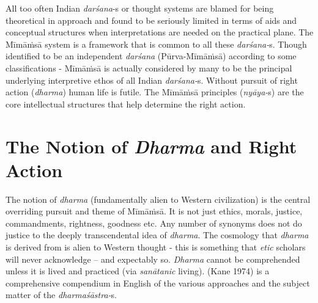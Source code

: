 All too often Indian \textit{darśana}-s or thought systems are blamed for being theoretical in approach and found to be seriously limited in terms of aids and conceptual structures when interpretations are needed on the practical plane. The Mīmāṁsā system is a framework that is common to all these \textit{darśana-}s. Though identified to be an independent \textit{darśana} (Pūrva-Mīmāṁsā) according to some classifications - Mīmāṁsā is actually considered by many to be the principal underlying interpretive ethos of all Indian \textit{darśana-}s. Without pursuit of right action (\textit{dharma}) human life is futile. The Mīmāṁsā principles (\textit{nyāya-}s) are the core intellectual structures that help determine the right action.


\section*{The Notion of \textit{Dharma} and Right Action}

\vspace{-.1cm}

The notion of \textit{dharma} (fundamentally alien to Western civilization) is the central overriding pursuit and theme of Mīmāṁsā. It is not just ethics, morals, justice, commandments, rightness, goodness etc. Any number of synonyms does not do justice to the deeply transcendental idea of \textit{dharma}. The cosmology that \textit{dharma} is derived from is alien to Western thought - this is something that \textit{etic} scholars will never acknowledge – and expectably so. \textit{Dharma} cannot be comprehended unless it is lived and practiced (via \textit{sanātanic} living). (Kane 1974) is a comprehensive compendium in English of the various approaches and the subject matter of the \textit{dharmaśāstra-}s.

\vspace{-.05cm}

